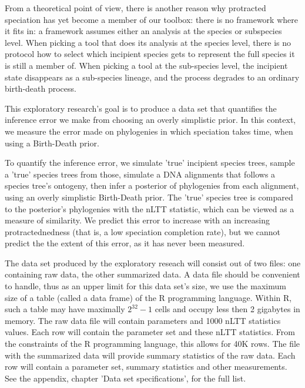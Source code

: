 \documentclass{article}
\begin{document}
From a theoretical point of view, there is another reason why protracted
speciation has yet become a member of our toolbox: there is no framework
where it fits in: a framework assumes either an analysis at the species or
subspecies level. When picking a tool that does its analysis at the
species level, there is no protocol how to select which incipient species
gets to represent the full species it is still a member of. When picking
a tool at the sub-species level, the incipient state disappears as a
sub-species lineage, and the process degrades to an ordinary birth-death 
process.

This exploratory research's goal is to produce a data set that 
quantifies the inference error we make from choosing an overly
simplistic prior. In this context, we measure the error made on
phylogenies in which speciation takes time, when using a Birth-Death
prior.


To quantify the inference error, we simulate 'true' incipient species
trees, sample a 'true' species trees from those, simulate a DNA alignments 
that follows a species tree's ontogeny, then infer a posterior of
phylogenies from each alignment, using an overly simplistic Birth-Death
prior. The 'true' species tree is compared to
the posterior's phylogenies with the nLTT statistic, which can be viewed
as a measure of similarity. We predict this error to increase with an
increasing protractednedness (that is, a low speciation completion rate),
but we cannot predict the the extent of this error, as it has never been 
measured.

The data set produced by the exploratory reseach will consist out of two files:
one containing raw data, the other summarized data. 
A data file should be convenient to handle, thus as an upper limit for this data set's size, 
we use the maximum size of a table (called a data frame) of the R programming 
language. Within R, such a table may have maximally $2^{32}-1$ cells and occupy
less then 2 gigabytes in memory. 
The raw data file will contain parameters and 1000 nLTT statistics values.
Each row will contain the parameter set and these nLTT statistics.
From the constraints of the R programming language, this allows for 40K rows. 
The file with the summarized data will provide summary statistics of the raw
data. Each row will contain a parameter set, summary statistics and other
measurements. See the appendix, chapter 'Data set specifications', for the full list.

\end{document}
